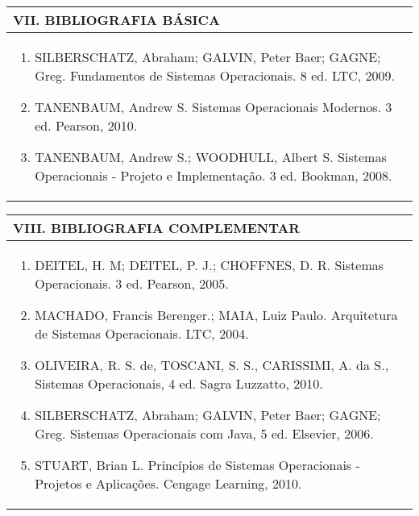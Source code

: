 \documentclass[12pt]{article}
\begin{document}
\begin{longtable}{|L{1.025\textwidth}|} \hline
%
{\bf VII. BIBLIOGRAFIA BÁSICA} \\ \hline
\begin{enumerate}
%
\item SILBERSCHATZ, Abraham; GALVIN, Peter Baer; GAGNE; Greg. Fundamentos de Sistemas Operacionais. 8 ed. LTC, 2009.
\item TANENBAUM, Andrew S. Sistemas Operacionais Modernos. 3 ed. Pearson, 2010.
\item TANENBAUM, Andrew S.; WOODHULL, Albert S. Sistemas Operacionais - Projeto e Implementação. 3 ed. Bookman, 2008.
\end{enumerate}
 \\ \hline
\end{longtable}


\newpage

\begin{longtable}{|L{1.025\textwidth}|} \hline
%
{\bf VIII. BIBLIOGRAFIA COMPLEMENTAR} \\ \hline
\begin{enumerate}
\item DEITEL, H. M; DEITEL, P. J.; CHOFFNES, D. R. Sistemas Operacionais. 3 ed. Pearson, 2005.
\item MACHADO, Francis Berenger.; MAIA, Luiz Paulo. Arquitetura de Sistemas Operacionais. LTC, 2004.
\item OLIVEIRA, R. S. de, TOSCANI, S. S., CARISSIMI, A. da S., Sistemas Operacionais, 4 ed. Sagra Luzzatto, 2010.
\item SILBERSCHATZ, Abraham; GALVIN, Peter Baer; GAGNE; Greg. Sistemas Operacionais com Java, 5 ed. Elsevier, 2006.
\item STUART, Brian L. Princípios de Sistemas Operacionais - Projetos e Aplicações. Cengage Learning, 2010.

%
\end{enumerate}
 \\ \hline
\end{longtable}



\end{document}
